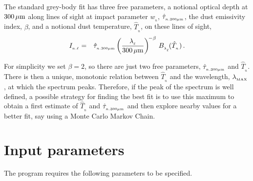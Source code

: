 \documentclass[usenatbib]{mn2e}
\numberwithin{equation}{section}
\begin{document}
The standard grey-body fit has three free parameters, a notional optical depth at $300\,\mu{\rm m}$ along lines of sight at impact parameter $w_{_n}$, ${\hat\tau}_{_{n.300\mu{\rm m}}}$, the dust emissivity index, $\beta$, and a notional dust temperature, $\hat{T}_{_n}$, on these lines of sight,
\begin{eqnarray}
I_{_{n.\ell}}&=&{\hat\tau}_{_{n.300\mu{\rm m}}}\left(\frac{\lambda_{_\ell}}{300\,\mu{\rm m}}\right)^{\!-\beta}\,B_{_{\lambda_{_\ell}}}\!(\hat{T}_{_n})\,.
\end{eqnarray}

For simplicity we set $\beta\!=\!2$, so there are just two free parameters, ${\hat\tau}_{_{n.300\mu{\rm m}}}$ and $\hat{T}_{_n}$. There is then a unique, monotonic relation between $\hat{T}_{_n}$ and the wavelength, $\lambda_{_{\rm MAX}}$, at which the spectrum peaks. Therefore, if the peak of the spectrum is well defined, a possible strategy for finding the best fit is to use this maximum to obtain a first estimate of $\hat{T}_{_n}$ and ${\hat\tau}_{_{n.300\mu{\rm m}}}$ and then explore nearby values for a better fit, say using a Monte Carlo Markov Chain.





\section{Input parameters}

The program requires the following parameters to be specified. \\
\end{document}
